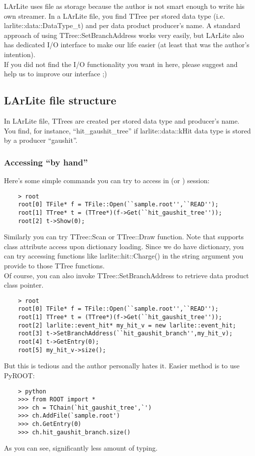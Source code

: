 
LArLite uses \ROOT file as storage because the author is not smart enough to write his own streamer.
In a LArLite \ROOT file, you find {\ttfamily TTree} per stored data type (i.e. {\ttfamily larlite::data::DataType\_t}) and per data product producer's name.
A standard approach of using {\ttfamily TTree::SetBranchAddress} works very easily, but LArLite also has dedicated I/O interface to make our life easier (at least that was the author's intention).\\

If you did not find the I/O functionality you want in here, please suggest and help us to improve our interface ;)

\subsection{LArLite \ROOT file structure}
In LArLite \ROOT file, TTrees are created per stored data type and producer's name. 
You find, for instance, ``hit\_gaushit\_tree'' if  {\ttfamily larlite::data::kHit} data type is stored by a producer ``gaushit''.

\subsubsection{Accessing ``by hand''}
Here's some simple commands you can try to access in \CINT (or \PyROOT) session:
\begin{lstlisting}
    > root
    root[0] TFile* f = TFile::Open(``sample.root'',``READ'');
    root[1] TTree* t = (TTree*)(f->Get(``hit_gaushit_tree''));
    root[2] t->Show(0);
\end{lstlisting}
Similarly you can try {\ttfamily TTree::Scan} or {\ttfamily TTree::Draw} function.
Note that \ROOT supports class attribute access upon \CINT dictionary loading.
Since we do have \CINT dictionary, you can try accessing functions like {\ttfamily larlite::hit::Charge()} in the string argument you provide to those {\ttfamily TTree} functions.\\

Of course, you can also invoke {\ttfamily TTree::SetBranchAddress} to retrieve data product class pointer.
\begin{lstlisting}
    > root
    root[0] TFile* f = TFile::Open(``sample.root'',``READ'');
    root[1] TTree* t = (TTree*)(f->Get(``hit_gaushit_tree''));
    root[2] larlite::event_hit* my_hit_v = new larlite::event_hit;
    root[3] t->SetBranchAddress(``hit_gaushit_branch'',my_hit_v);
    root[4] t->GetEntry(0);
    root[5] my_hit_v->size();
\end{lstlisting}
But this is tedious and the author personally hates it.
Easier method is to use PyROOT:
\begin{lstlisting}
    > python
    >>> from ROOT import *
    >>> ch = TChain(`hit_gaushit_tree',`')
    >>> ch.AddFile(`sample.root')
    >>> ch.GetEntry(0)
    >>> ch.hit_gaushit_branch.size()
\end{lstlisting}
As you can see, significantly less amount of typing. 

